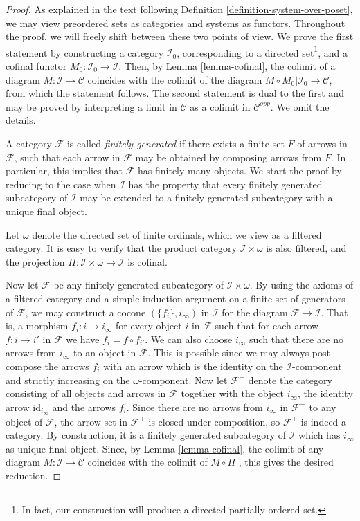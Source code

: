 \begin{proof}
As explained in the text following
Definition \ref{definition-system-over-poset}, we may view
preordered sets as categories and systems as functors.
Throughout the proof, we will freely shift between these two points of view.
We prove the first statement by constructing a category
$\mathcal{I}_0$, corresponding to a directed set\footnote{In fact,
our construction will produce a directed partially ordered set.}, and a cofinal
functor $M_0 : \mathcal{I}_0 \to \mathcal{I}$. Then, by
Lemma \ref{lemma-cofinal}, the colimit of a diagram
$M : \mathcal{I} \to \mathcal{C}$ coincides with the
colimit of the diagram $M \circ M_0 | \mathcal{I}_0 \to \mathcal{C}$,
from which the statement follows. The second statement is dual to the
first and may be proved by interpreting a limit in $\mathcal{C}$ as
a colimit in $\mathcal{C}^{opp}$. We omit the details.

\medskip\noindent
A category $\mathcal{F}$ is called {\em finitely generated} if
there exists a finite set $F$ of arrows in $\mathcal{F}$, such that
each arrow in $\mathcal{F}$ may be obtained by composing
arrows from $F$. In particular, this implies that $\mathcal{F}$ has
finitely many objects. We start the proof by reducing to the case
when $\mathcal{I}$ has the property that every finitely generated
subcategory of $\mathcal{I}$ may be extended to a finitely
generated subcategory with a unique final object.

\medskip\noindent
Let $\omega$ denote the directed set of finite ordinals, which
we view as a filtered category. It is easy to verify that the
product category $\mathcal{I}\times \omega$ is also filtered,
and the projection
$\Pi : \mathcal{I} \times \omega \to \mathcal{I}$
is cofinal.

\medskip\noindent
Now let $\mathcal{F}$ be any finitely generated
subcategory of $\mathcal{I}\times \omega$.
By using the axioms of a filtered category and a simple induction
argument on a finite set of generators of $\mathcal{F}$,
we may construct a cocone $(\{f_i\}, i_\infty)$ in $\mathcal{I}$
for the diagram $\mathcal{F} \to \mathcal{I}$. That is, a morphism
$f_i : i \to i_\infty$ for every object $i$ in $\mathcal{F}$
such that for each arrow $f : i \to i'$ in $\mathcal{F}$
we have $f_i = f\circ f_{i'}$. We can also choose $i_\infty$ such
that there are no arrows from $i_\infty$ to an object in $\mathcal{F}$.
This is possible since
we may always post-compose the arrows $f_i$ with an arrow
which is the identity on the $\mathcal{I}$-component and
strictly increasing on the $\omega$-component.
Now let $\mathcal{F}^+$ denote the category consisting of all
objects and arrows in $\mathcal{F}$
together with the object $i_\infty$, the identity
arrow $\text{id}_{i_\infty}$ and the arrows $f_i$.
Since there are no arrows from $i_\infty$ in $\mathcal{F}^+$
to any object of $\mathcal{F}$, the arrow set in $\mathcal{F}^+$
is closed under composition, so $\mathcal{F}^+$ is indeed
a category. By construction, it is a finitely
generated subcategory of $\mathcal{I}$ which has $i_\infty$ as
unique final object. Since, by Lemma \ref{lemma-cofinal},
the colimit of  any diagram $M : \mathcal{I} \to \mathcal{C}$
coincides with the colimit of $M\circ\Pi$ , this gives the desired
reduction.


\end{proof}
